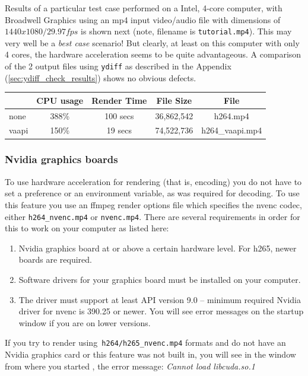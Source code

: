 Results of a particular test case performed on a Intel, 4-core computer, with Broadwell Graphics using an mp4 input video/audio file with dimensions of
$1440x1080 / 29.97fps$ is shown next (note, filename is \texttt{tutorial.mp4}).  This may very well be a \textit{best case} scenario!  But clearly, at least on this computer with only 4 cores, the hardware acceleration seems to be quite advantageous.  A comparison of the 2 output files 
using \texttt{ydiff} as described in the Appendix (\ref{sec:ydiff_check_results}) shows no obvious defects.

\begin{center}
	\begin{tabular}{l|cccc}
		&CPU usage & Render Time & File Size & File \\
		\hline
		none & 388\% &100 secs &36,862,542 & h264.mp4 \\
		vaapi & 150\% & 19 secs & 74,522,736 & h264\_vaapi.mp4 \\
	\end{tabular}
\end{center}

\subsubsection*{Nvidia graphics boards}%
\label{ssub:nvidia_graphics_card}

To use hardware acceleration for rendering (that is, encoding) you do not have to set a preference or an environment variable, as was required for decoding.  To use this feature you use an ffmpeg render options file which specifies the nvenc codec, either \texttt{h264\_nvenc.mp4} or \texttt{nvenc.mp4}.  There are several requirements in order for this to work on your computer as listed here:

\begin{enumerate}
	\item Nvidia graphics board at or above a certain hardware level.  For h265, newer boards are required.
	\item Software drivers for your graphics board must be installed on your computer.
	\item The driver must support at least API version 9.0 -- minimum required Nvidia driver for nvenc is
	390.25 or newer.  You will see error messages on the startup window if you are on lower versions.
\end{enumerate}

If you try to render using\texttt{ h264/h265\_nvenc.mp4} formats and do not have an Nvidia graphics card or this feature was not built in, you will see in the window from where you started \CGG{}, the error message: \qquad \textit{Cannot load libcuda.so.1}

